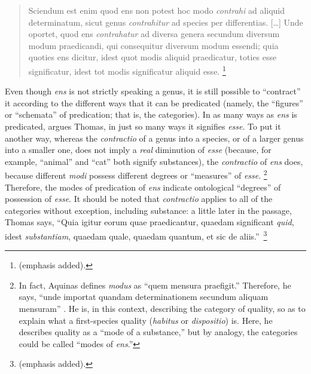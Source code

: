 \begin{quotation}
Sciendum est enim quod ens non potest hoc modo \emph{contrahi} ad aliquid determinatum, sicut genus \emph{contrahitur} ad species per differentias. [\ldots] Unde oportet, quod ens \emph{contrahatur} ad diversa genera secundum diversum modum praedicandi, qui consequitur diversum modum essendi; quia quoties ens dicitur, idest quot modis aliquid praedicatur, toties esse significatur, idest tot modis significatur aliquid esse.%
%
\footnote{\Cite[V, l.~9, n.~5--6 (Marietti n.~889--890)]{st:metaph} (emphasis added).}
%
\end{quotation}
%
Even though \emph{ens} is not strictly speaking a genus, it is still possible to ``contract'' it according to the different ways that it can be predicated (namely, the ``figures'' or  ``schemata'' of predication; that is, the categories). In as many ways as \emph{ens} is predicated, argues Thomas, in just so many ways it signifies \emph{esse}. To put it another way, whereas the \emph{contractio} of a genus into a species, or of a larger genus into a smaller one, does not imply a \emph{real} diminution of \emph{esse} (because, for example, ``animal'' and ``cat'' both signify substances), the \emph{contractio} of \emph{ens} does, because different \emph{modi} possess different degrees or ``measures'' of \emph{esse}.%
%
\footnote{In fact, Aquinas defines \emph{modus} as ``quem mensura praefigit.'' Therefore, he says, ``unde importat quandam determinationem secundum aliquam mensuram'' \parencite[I-II, q.~49, a.~2, co.]{st:summa}. He is, in this context, describing the category of quality, so as to explain what a first-species quality (\emph{habitus} or \emph{dispositio}) is. Here, he describes quality as a ``mode of a substance,'' but by analogy, the categories could be called ``modes of \emph{ens}.''}
%
Therefore, the modes of predication of \emph{ens} indicate ontological ``degrees'' of possession of \emph{esse}. It should be noted that \emph{contractio} applies to all of the categories without exception, including substance: a little later in the passage, Thomas says, ``Quia igitur eorum quae praedicantur, quaedam significant \emph{quid}, idest \emph{substantiam}, quaedam quale, quaedam quantum, et sic de aliis.''\,%
%
\footnote{\Cite[V, lib.~5, l.~9 n.~6 (Marietti n.~890)]{st:metaph} (emphasis added).}
%

